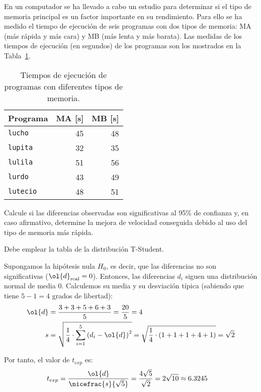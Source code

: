 \begin{ejercicio}\label{ej:4.11}
En un computador se ha llevado a cabo un estudio para determinar si el tipo de memoria principal es un factor importante en su rendimiento. Para ello se ha medido el tiempo de ejecución de seis programas con dos tipos de memoria: MA (más rápida y más cara) y MB (más lenta y más barata). Las medidas de los tiempos de ejecución (en segundos) de los programas son los mostrados en la Tabla~\ref{tab:ej:4.11}.
\begin{table}[h]
\centering
\begin{tabular}{@{}lrr@{}}
\toprule
Programa & MA [s] & MB [s] \\ \midrule
\verb|lucho| & 45 & 48 \\
\verb|lupita| & 32 & 35 \\
\verb|lulila| & 51 & 56 \\
\verb|lurdo| & 43 & 49 \\
\verb|lutecio| & 48 & 51 \\ \bottomrule
\end{tabular}
\caption{Tiempos de ejecución de programas con diferentes tipos de memoria.}
\label{tab:ej:4.11}
\end{table}
Calcule si las diferencias observadas son significativas al 95\% de confianza y, en caso afirmativo, determine la mejora de velocidad conseguida debido al uso del tipo de memoria más rápida. 
\begin{observacion}
Debe emplear la tabla de la distribución T-Student.
\end{observacion}

Supongamos la hipótesis nula $H_0$, es decir, que las diferencias no son significativas ($\ol{d}_{\text{real}}=0$). Entonces, las diferencias $d_i$ siguen una distribución normal de media $0$. Calculemos su media y su desviación típica (sabiendo que tiene $5-1=4$ grados de libertad):
\begin{align*}
    \ol{d} &= \dfrac{3 + 3 + 5 + 6 + 3}{5} = \dfrac{20}{5} = 4\\
    s &= \sqrt{\dfrac{1}{4}\cdot \sum_{i=1}^5 \left(d_i-\ol{d}\right)^2} = \sqrt{\dfrac{1}{4}\cdot \left(1+1+1+4+1\right)} = \sqrt{2}
\end{align*}

Por tanto, el valor de $t_{exp}$ es:
\begin{align*}
    t_{exp} &= \dfrac{\ol{d}}{\nicefrac{s}{\sqrt{5}}} = \dfrac{4\sqrt{5}}{\sqrt{2}} = 2\sqrt{10}\approx 6.3245
\end{align*}


\end{ejercicio}
